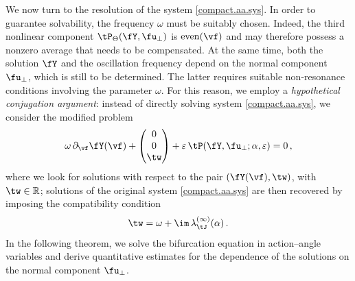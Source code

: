 \documentclass[a4paper,reqno,10pt]{article}
\newcommand{\pa}{\partial}
\begin{document}
We now turn to the resolution of the system \eqref{compact.aa.sys}. In order to guarantee solvability, the frequency $\omega$ must be suitably chosen. Indeed, the third nonlinear component $\tP_{\Theta}(\fY,\fu_{\perp})$ is ${\rm even}(\vf)$ and may therefore possess a nonzero average that needs to be compensated.
At the same time, both the solution $\fY$ and the oscillation frequency depend on the normal component $\fu_{\perp}$, which is still to be determined. The latter requires suitable non-resonance conditions involving the parameter $\omega$.
For this reason, we employ a {\it hypothetical conjugation argument}: instead of directly solving system \eqref{compact.aa.sys}, we consider the modified problem
\begin{equation}\label{mod.aa.sys}
	\omega\,\pa_{\vf}\fY(\vf)
	+
	\begin{pmatrix}
		0 \\ 0 \\ \tw
	\end{pmatrix}
	+
	\varepsilon\, \tP(\fY,\fu_{\perp};\alpha,\varepsilon)
	= 0 \,,
\end{equation}
where we look for solutions with respect to the pair $(\fY(\vf),\tw)$, with $\tw \in \mathbb{R}$;
solutions of the original system \eqref{compact.aa.sys} are then recovered by imposing the compatibility condition
\begin{equation}\label{tw.back}
	\tw = \omega + \im\,\lambda_{\tJ}^{(\infty)}(\alpha) \,.
\end{equation}
In the following theorem, we solve the bifurcation equation in action–angle variables and derive quantitative estimates for the dependence of the solutions on the normal component $\fu_{\perp}$.
\end{document}

